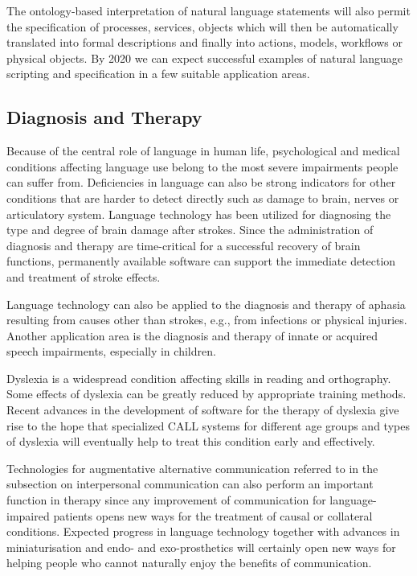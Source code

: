 \documentclass[10pt, plain]{../../metanetpaper}
\begin{document}
\begin{multicols}{2}
The ontology-based interpretation of natural language statements will also permit the specification of processes, services, objects which will then be automatically translated into formal descriptions and finally into actions, models, workflows or physical objects.  By 2020 we can expect successful examples of natural language scripting and specification in a few suitable application areas.

\subsection{Diagnosis and Therapy}
\label{sec:diagnosis-therapy}

Because of the central role of language in human life, psychological and medical conditions affecting language use belong to the most severe impairments people can suffer from. Deficiencies in language can also be strong indicators for other conditions that are harder to detect directly such as damage to brain, nerves or articulatory system. Language technology has been utilized for diagnosing the type and degree of brain damage after strokes. Since the administration of diagnosis and therapy are time-critical for a successful recovery of brain functions, permanently available software can support the immediate detection and treatment of stroke effects.
 
Language technology can also be applied to the diagnosis and therapy of aphasia resulting from causes other than strokes, e.g., from infections or physical injuries. Another application area is the diagnosis and therapy of innate or acquired speech impairments, especially in children. 
 
Dyslexia is a widespread condition affecting skills in reading and orthography. Some effects of dyslexia can be greatly reduced by appropriate training methods. Recent advances in the development of software for the therapy of dyslexia give rise to the hope that specialized CALL systems for different age groups and types of dyslexia will eventually help to treat this condition early and effectively.
 
Technologies for augmentative alternative communication referred to in the subsection on interpersonal communication can also perform an important function in therapy since any improvement of communication for language-impaired patients opens new ways for the treatment of causal or collateral conditions. Expected progress in language technology together with advances in miniaturisation and endo- and exo-prosthetics will certainly open new ways for helping people who cannot naturally enjoy the benefits of communication.


\end{multicols}
\end{document}
